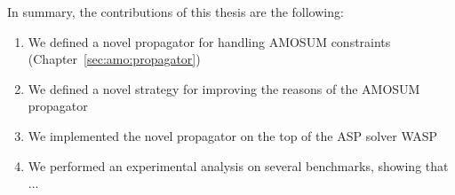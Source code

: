 In summary, the contributions of this thesis are the following:
\begin{enumerate}
    \item We defined a novel propagator for handling AMOSUM constraints (Chapter~\ref{sec:amo:propagator})
    \item We defined a novel strategy for improving the reasons of the AMOSUM propagator
    \item We implemented the novel propagator on the top of the ASP solver WASP
    \item We performed an experimental analysis on several benchmarks, showing that ...
\end{enumerate}
